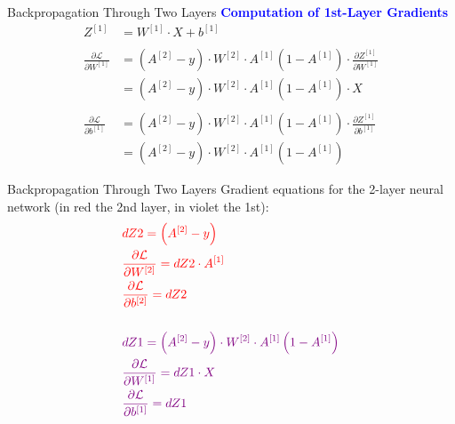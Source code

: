 \documentclass[aspectratio=169]{beamer}
\begin{document}
\begin{frame}{Backpropagation Through Two Layers}
\textbf{\textcolor{blue}{Computation of 1st-Layer Gradients}}\\

\begin{align*}
Z^{[1]} &= W^{[1]} \cdot X + b^{[1]} \\
&\\
\frac{\partial \mathcal{L}}{\partial W^{[1]}} &= 
\left( A^{[2]} - y \right)
\cdot 
W^{[2]} 
\cdot
A^{[1]} \left( 1 - A^{[1]} \right) 
\cdot 
\frac{\partial Z^{[1]}}{\partial W^{[1]}}
\\
&= \left( A^{[2]} - y \right)
\cdot 
W^{[2]} 
\cdot
A^{[1]} \left( 1 - A^{[1]} \right) 
\cdot 
X
\\&\\
\frac{\partial \mathcal{L}}{\partial b^{[1]}} &= 
\left( A^{[2]} - y \right)
\cdot 
W^{[2]} 
\cdot
A^{[1]} \left( 1 - A^{[1]} \right) 
\cdot 
\frac{\partial Z^{[1]}}{\partial b^{[1]}}
\\
&= \left( A^{[2]} - y \right)
\cdot 
W^{[2]} 
\cdot
A^{[1]} \left( 1 - A^{[1]} \right) 
\end{align*}
\end{frame}
%
%
\begin{frame}{Backpropagation Through Two Layers}
Gradient equations for the 2-layer neural network (in red the 2nd layer, in violet the 1st):
\begin{align*}
&\textcolor{red}{dZ2 = \left( A^{[2]} - y \right)} 
\\
&\textcolor{red}{\frac{\partial \mathcal{L}}{\partial W^{[2]}} = dZ2 \cdot A^{[1]}} 
\\
&\textcolor{red}{\frac{\partial \mathcal{L}}{\partial b^{[2]}} = dZ2}
\\&\\
&\textcolor{violet}{dZ1 = \left( A^{[2]} - y \right)
\cdot 
W^{[2]} 
\cdot
A^{[1]} \left( 1 - A^{[1]} \right)} 
\\
&\textcolor{violet}{\frac{\partial \mathcal{L}}{\partial W^{[1]}} = dZ1 \cdot X}
\\
&\textcolor{violet}{\frac{\partial \mathcal{L}}{\partial b^{[1]}} = dZ1}
\end{align*}
\end{frame}
%
%
\end{document}
